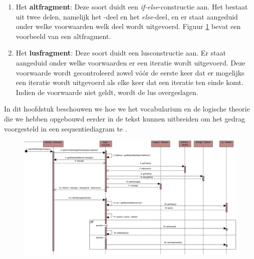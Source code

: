 \begin{enumerate}
	\item Het \textbf{altfragment}: Deze soort duidt een \textit{if-else}-constructie aan. Het bestaat uit twee delen, namelijk het -deel en het \textit{else}-deel, en er staat aangeduid onder welke voorwaarden welk deel wordt uitgevoerd. Figuur \ref{fig:seq-diagram-game} bevat een voorbeeld van een altfragment.
	\item Het \textbf{lusfragment}: Deze soort duidt een lusconstructie aan. Er staat aangeduid onder welke voorwaarden er een iteratie wordt uitgevoerd. Deze voorwaarde wordt gecontroleerd zowel v\'o\'or de eerste keer dat er mogelijks een iteratie wordt uitgevoerd als elke keer dat een iteratie ten einde komt. Indien de voorwaarde niet geldt, wordt de lus overgeslagen. 
\end{enumerate}

In dit hoofdstuk beschouwen we hoe we het vocabularium en de logische theorie die we hebben opgebouwd eerder in de tekst kunnen uitbreiden om het gedrag voorgesteld in een sequentiediagram te \DIFdelbegin {}\DIFdelend \DIFaddbegin {}\DIFaddend .

\DIFaddbegin \begin{landscape}
\begin{figure}
	\label{fig:seq-diagram-game}
	\includegraphics[width=1.5\textwidth]{chap-gedrag/seq-diagram-game.png}
	\caption{}
\end{figure}
\end{landscape}

